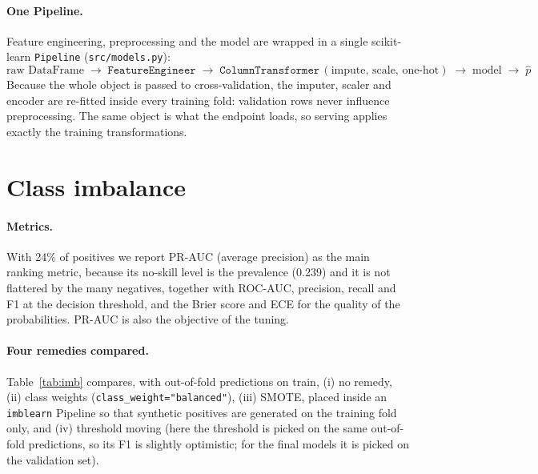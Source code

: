 \documentclass[11pt,a4paper]{article}
\newcommand{\code}[1]{\texttt{#1}}
\begin{document}
\paragraph{One Pipeline.} Feature engineering, preprocessing and the model are wrapped in a single
scikit-learn \code{Pipeline} (\code{src/models.py}):
\[
\text{raw DataFrame}\;\rightarrow\;\code{FeatureEngineer}\;\rightarrow\;
\code{ColumnTransformer}\,(\text{impute, scale, one-hot})\;\rightarrow\;\text{model}\;\rightarrow\;\hat p
\]
Because the whole object is passed to cross-validation, the imputer, scaler and encoder are
re-fitted inside every training fold: validation rows never influence preprocessing. The same
object is what the endpoint loads, so serving applies exactly the training transformations.

\section{Class imbalance}\label{sec:imbalance}

\paragraph{Metrics.} With 24\% of positives we report PR-AUC (average precision) as the main ranking
metric, because its no-skill level is the prevalence (0.239) and it is not flattered by the many
negatives, together with ROC-AUC, precision, recall and F1 at the decision threshold, and the Brier
score and ECE for the quality of the probabilities. PR-AUC is also the objective of the tuning.

\paragraph{Four remedies compared.} Table~\ref{tab:imb} compares, with out-of-fold predictions on
train, (i) no remedy, (ii) class weights (\code{class\_weight="balanced"}), (iii) SMOTE, placed
inside an \code{imblearn} Pipeline so that synthetic positives are generated on the training fold
only, and (iv) threshold moving (here the threshold is picked on the same out-of-fold predictions,
so its F1 is slightly optimistic; for the final models it is picked on the validation set).
\end{document}
